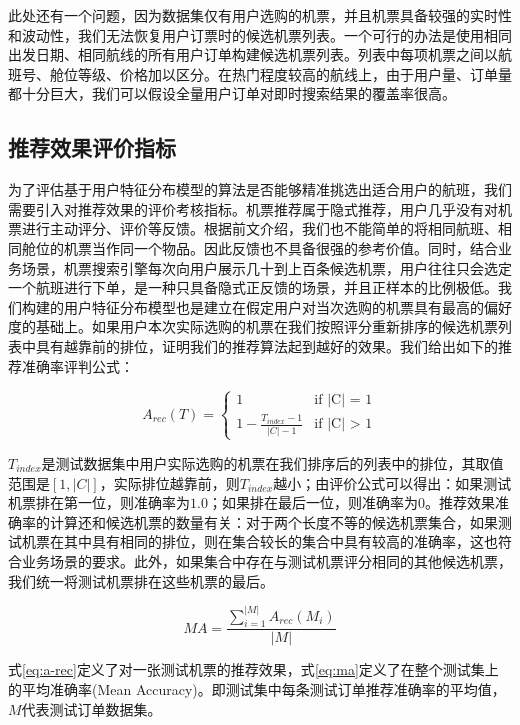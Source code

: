 此处还有一个问题，因为数据集仅有用户选购的机票，并且机票具备较强的实时性和波动性，我们无法恢复用户订票时的候选机票列表。一个可行的办法是使用相同出发日期、相同航线的所有用户订单构建候选机票列表。列表中每项机票之间以航班号、舱位等级、价格加以区分。在热门程度较高的航线上，由于用户量、订单量都十分巨大，我们可以假设全量用户订单对即时搜索结果的覆盖率很高。


\subsection{推荐效果评价指标}
为了评估基于用户特征分布模型的算法是否能够精准挑选出适合用户的航班，我们需要引入对推荐效果的评价考核指标。机票推荐属于隐式推荐，用户几乎没有对机票进行主动评分、评价等反馈。根据前文介绍，我们也不能简单的将相同航班、相同舱位的机票当作同一个物品。因此反馈也不具备很强的参考价值。同时，结合业务场景，机票搜索引擎每次向用户展示几十到上百条候选机票，用户往往只会选定一个航班进行下单，是一种只具备隐式正反馈的场景，并且正样本的比例极低。我们构建的用户特征分布模型也是建立在假定用户对当次选购的机票具有最高的偏好度的基础上。如果用户本次实际选购的机票在我们按照评分重新排序的候选机票列表中具有越靠前的排位，证明我们的推荐算法起到越好的效果。我们给出如下的推荐准确率评判公式：

\begin{equation}
\label{eq:a-rec}
A_{rec}(T) =
\begin{cases}
1 & \mbox{if |C| = 1}\\
1 - \frac{T_{index}-1}{|C|-1} & \mbox{if |C| > 1}
\end{cases}
\end{equation}

$T_{index}$是测试数据集中用户实际选购的机票在我们排序后的列表中的排位，其取值范围是$[1,|C|]$，实际排位越靠前，则$T_{index}$越小；由评价公式可以得出：如果测试机票排在第一位，则准确率为$1.0$；如果排在最后一位，则准确率为$0$。推荐效果准确率的计算还和候选机票的数量有关：对于两个长度不等的候选机票集合，如果测试机票在其中具有相同的排位，则在集合较长的集合中具有较高的准确率，这也符合业务场景的要求。此外，如果集合中存在与测试机票评分相同的其他候选机票，我们统一将测试机票排在这些机票的最后。

\begin{equation}
\label{eq:ma}
MA = \frac{\sum_{i=1}^{|M|}A_{rec}(M_i)}{|M|}
\end{equation}

式\ref{eq:a-rec}定义了对一张测试机票的推荐效果，式\ref{eq:ma}定义了在整个测试集上的平均准确率(Mean Accuracy)。即测试集中每条测试订单推荐准确率的平均值，$M$代表测试订单数据集。

